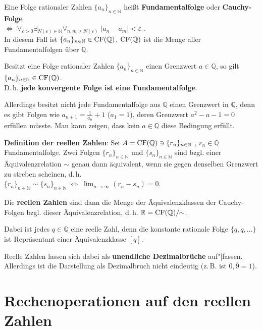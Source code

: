 Eine Folge rationaler Zahlen $\{a_n\}_{n \in \mathbb{N}}$ heißt
\textbf{Fundamentalfolge} oder \textbf{Cauchy-Folge} \\
$\Leftrightarrow\; \forall_{\varepsilon > 0}
\exists_{N(\varepsilon) \in \mathbb{N}} \forall_{n,m \ge N(\varepsilon)}\;
|a_n - a_m| < \varepsilon$-. \\
In diesem Fall ist $\{a_n\}_{n \in \mathbb{N}} \in \operatorname{CF}(\mathbb{Q})$,
$\operatorname{CF}(\mathbb{Q})$ ist die Menge aller Fundamentalfolgen über
$\mathbb{Q}$.

Besitzt eine Folge rationaler Zahlen $\{a_n\}_{n \in \mathbb{N}}$ einen
Grenzwert $a \in \mathbb{Q}$, so gilt
$\{a_n\}_{n \in \mathbb{N}} \in \operatorname{CF}(\mathbb{Q})$. \\
D.\,h. \textbf{jede konvergente Folge ist eine Fundamentalfolge}.

Allerdings besitzt nicht jede Fundamentalfolge aus $\mathbb{Q}$ einen Grenzwert
in $\mathbb{Q}$, denn es gibt Folgen wie $a_{n+1} = \frac{1}{a_n} + 1$
($a_1 = 1$), deren Grenzwert $a^2 - a - 1 = 0$ erfüllen müsste. Man kann
zeigen, dass kein $a \in \mathbb{Q}$ diese Bedingung erfüllt.

\linie

\textbf{Definition der reellen Zahlen}: Sei $A = \operatorname{CF}(\mathbb{Q})
\ni \{r_n\}_{n \in \mathbb{N}}$ , $r_n \in \mathbb{Q}$ Fundamentalfolge. Zwei
Folgen $\{r_n\}_{n \in \mathbb{N}}$ und $\{s_n\}_{n \in \mathbb{N}}$ sind bzgl.
einer Äquivalenzrelation $\sim$ genau dann äquivalent, wenn sie gegen denselben
Grenzwert zu streben scheinen, d.\,h. \\
$\{r_n\}_{n \in \mathbb{N}} \sim \{s_n\}_{n \in \mathbb{N}}
\;\Leftrightarrow\; \lim_{n \to \infty} (r_n - s_n) = 0$.

Die \textbf{reellen Zahlen} sind dann die Menge der Äquivalenzklassen der
Cauchy-Folgen bzgl. dieser Äquivalenzrelation, d.\,h.
$\mathbb{R} = \operatorname{CF}(\mathbb{Q})/\!\!\sim$.

Dabei ist jedes $q \in \mathbb{Q}$ eine reelle Zahl, denn die konstante
rationale Folge $\{q, q, \ldots\}$ ist Repräsentant einer Äquivalenzklasse
$[q]$.

Reelle Zahlen lassen sich dabei als \textbf{unendliche Dezimalbrüche}
auf"|fassen. Allerdings ist die Darstellung als Dezimalbruch nicht eindeutig
(z.\,B. ist $0,\overline{9} = 1$).

\pagebreak

\section{%
    Rechenoperationen auf den reellen Zahlen%
}

